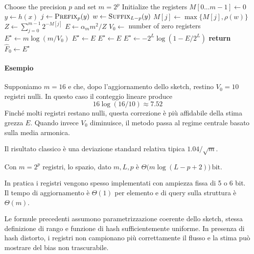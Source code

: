 \begin{algorithm}[htbp]
    \caption{HyperLogLog}
    \label{alg:hll}
    \begin{algorithmic}
        \STATE Choose the precision $p$ and set $m=2^p$
        \STATE Initialize the registers $M[0 \dots m-1]\leftarrow 0$
            \STATE $y \leftarrow h(x)$
            \STATE $j \leftarrow \textsc{Prefix}_p(y)$
            \STATE $w \leftarrow \textsc{Suffix}_{L-p}(y)$
            \STATE $M[j] \leftarrow \max\{M[j],\rho(w)\}$
        \ENDFOR
        \STATE $Z \leftarrow \sum_{j=0}^{m-1} 2^{-M[j]}$
        \STATE $E \leftarrow \alpha_m m^2 / Z$
            \STATE $V_0 \leftarrow$ number of zero registers
                \STATE $E^\star \leftarrow m\log(m/V_0)$
            \ELSE
                \STATE $E^\star \leftarrow E$
            \ENDIF
            \STATE $E^\star \leftarrow E$
        \ELSE
            \STATE $E^\star \leftarrow -2^{L}\log(1-E/2^{L})$
        \ENDIF
        \STATE \textbf{return} $\hat{F}_0 \leftarrow E^\star$
    \end{algorithmic}
\end{algorithm}

\paragraph{Esempio}
Supponiamo $m=16$ e che, dopo l'aggiornamento dello sketch, restino
$V_0=10$ registri nulli. In questo caso il conteggio lineare produce
\[
16\log(16/10)\approx 7.52
\]
Finché molti registri restano nulli, questa correzione è più affidabile della
stima grezza $E$. Quando invece $V_0$ diminuisce, il metodo passa al regime
centrale basato sulla media armonica.

Il risultato classico è una deviazione standard relativa tipica $1.04/\sqrt{m}$\cite{Flajolet_Fusy_Gandouet_Meunier_2007}.

Con $m=2^p$ registri, lo spazio, dato $m, L, p$ è $\Theta\!\bigl(m\log(L-p+2)\bigr)\,\text{bit}$.

In pratica i registri vengono spesso implementati con ampiezza fissa
di 5 o 6 bit. Il tempo di aggiornamento è $\Theta(1)$ per elemento e di query sulla struttura è $\Theta(m)$.

Le formule precedenti assumono parametrizzazione coerente dello sketch, stessa
definizione di rango e funzione di hash sufficientemente uniforme. In presenza
di hash distorto, i registri non campionano più correttamente il flusso e la
stima può mostrare del bias non trascurabile.

